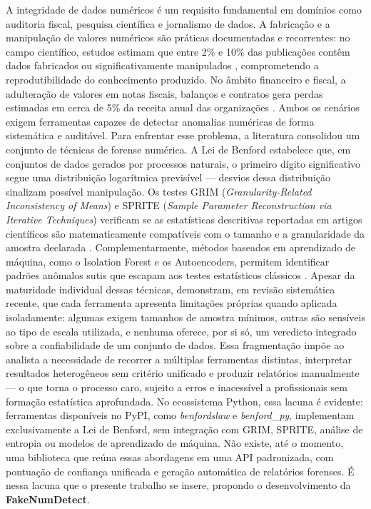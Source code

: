 \documentclass[
    12pt,                %
    openright,           %
    oneside,             %
    a4paper,             %
    english,             %
    brazil               %
]{abntex2}
\begin{document}
A integridade de dados numéricos é um requisito fundamental em domínios como auditoria fiscal, pesquisa científica e jornalismo de dados. A fabricação e a manipulação de valores numéricos são práticas documentadas e recorrentes: no campo científico, estudos estimam que entre 2\% e 10\% das publicações contêm dados fabricados ou significativamente manipulados \cite{Simonsohn2013}, comprometendo a reprodutibilidade do conhecimento produzido. No âmbito financeiro e fiscal, a adulteração de valores em notas fiscais, balanços e contratos gera perdas estimadas em cerca de 5\% da receita anual das organizações \cite{Ustinova2022}. Ambos os cenários exigem ferramentas capazes de detectar anomalias numéricas de forma sistemática e auditável.
Para enfrentar esse problema, a literatura consolidou um conjunto de técnicas de forense numérica. A Lei de Benford \cite{Benford1938} estabelece que, em conjuntos de dados gerados por processos naturais, o primeiro dígito significativo segue uma distribuição logarítmica previsível — desvios dessa distribuição sinalizam possível manipulação. Os testes GRIM (\textit{Granularity-Related Inconsistency of Means}) e SPRITE (\textit{Sample Parameter Reconstruction via Iterative Techniques}) verificam se as estatísticas descritivas reportadas em artigos científicos são matematicamente compatíveis com o tamanho e a granularidade da amostra declarada \cite{BrownHeathers2017, Heathers2018}. Complementarmente, métodos baseados em aprendizado de máquina, como o Isolation Forest e os Autoencoders, permitem identificar padrões anômalos sutis que escapam aos testes estatísticos clássicos \cite{Ndibe2025}.
Apesar da maturidade individual dessas técnicas,  demonstram, em revisão sistemática recente, que cada ferramenta apresenta limitações próprias quando aplicada isoladamente: algumas exigem tamanhos de amostra mínimos, outras são sensíveis ao tipo de escala utilizada, e nenhuma oferece, por si só, um veredicto integrado sobre a confiabilidade de um conjunto de dados. Essa fragmentação impõe ao analista a necessidade de recorrer a múltiplas ferramentas distintas, interpretar resultados heterogêneos sem critério unificado e produzir relatórios manualmente — o que torna o processo caro, sujeito a erros e inacessível a profissionais sem formação estatística aprofundada.
No ecossistema Python, essa lacuna é evidente: ferramentas disponíveis no PyPI, como \textit{benfordslaw} e \textit{benford\_py}, implementam exclusivamente a Lei de Benford, sem integração com GRIM, SPRITE, análise de entropia ou modelos de aprendizado de máquina. Não existe, até o momento, uma biblioteca que reúna essas abordagens em uma API padronizada, com pontuação de confiança unificada e geração automática de relatórios forenses. É nessa lacuna que o presente trabalho se insere, propondo o desenvolvimento da \textbf{FakeNumDetect}.
\end{document}
